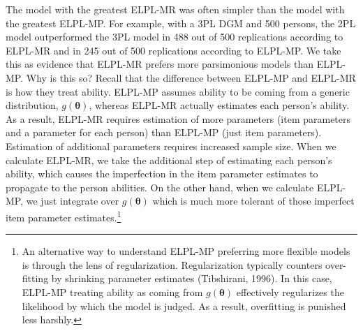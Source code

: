 \documentclass[
  english,
  man,floatsintext]{apa7}
\begin{document}
The model with the greatest ELPL-MR was often simpler than the model with the greatest ELPL-MP. For example, with a 3PL DGM and 500 persons, the 2PL model outperformed the 3PL model in 488 out of 500 replications according to ELPL-MR and in 245 out of 500 replications according to ELPL-MP. We take this as evidence that ELPL-MR prefers more parsimonious models than ELPL-MP. Why is this so? Recall that the difference between ELPL-MP and ELPL-MR is how they treat ability. ELPL-MP assumes ability to be coming from a generic distribution, \(g(\bm{\theta})\), whereas ELPL-MR actually estimates each person's ability. As a result, ELPL-MR requires estimation of more parameters (item parameters and a parameter for each person) than ELPL-MP (just item parameters). Estimation of additional parameters requires increased sample size. When we calculate ELPL-MR, we take the additional step of estimating each person's ability, which causes the imperfection in the item parameter estimates to propagate to the person abilities. On the other hand, when we calculate ELPL-MP, we just integrate over \(g(\bm{\theta})\) which is much more tolerant of those imperfect item parameter estimates.\footnote{An alternative way to understand ELPL-MP preferring more flexible models is through the lens of regularization. Regularization typically counters over-fitting by shrinking parameter estimates (Tibshirani, 1996). In this case, ELPL-MP treating ability as coming from \(g(\bm{\theta})\) effectively regularizes the likelihood by which the model is judged. As a result, overfitting is punished less harshly.}
\end{document}
